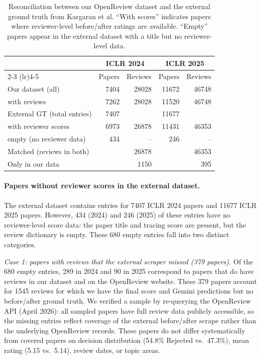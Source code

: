 \documentclass{article}
\begin{document}
\begin{table}[htbp]
  \centering
  \caption{Reconciliation between our OpenReview dataset and the external ground truth from Kargaran et al. ``With scores'' indicates papers where reviewer-level before/after ratings are available. ``Empty'' papers appear in the external dataset with a title but no reviewer-level data.}
  \label{tab:external-gt}
  \small
  \begin{tabular}{lrrrr}
    \toprule
    & \multicolumn{2}{c}{\textbf{ICLR 2024}} & \multicolumn{2}{c}{\textbf{ICLR 2025}} \\
    \cmidrule(lr){2-3} \cmidrule(lr){4-5}
    & Papers & Reviews & Papers & Reviews \\
    \midrule
    Our dataset (all)              & \num{7404}  & \num{28028}  & \num{11672} & \num{46748}  \\
    \quad with reviews             & \num{7262}  & \num{28028}  & \num{11520} & \num{46748}  \\
    External GT (total entries)    & \num{7407}  &              & \num{11677} &              \\
    \quad with reviewer scores     & \num{6973}  & \num{26878}  & \num{11431} & \num{46353}  \\
    \quad empty (no reviewer data) & 434         & --           & 246         & --           \\
    \midrule
    Matched (reviews in both)      &             & \num{26878}  &             & \num{46353}  \\
    Only in our data               &             & \num{1150}   &             & 395          \\
    \bottomrule
  \end{tabular}
\end{table}

\paragraph{Papers without reviewer scores in the external dataset.}
The external dataset contains entries for \num{7407} ICLR 2024 papers and \num{11677} ICLR 2025 papers. However, 434 (2024) and 246 (2025) of these entries have no reviewer-level score data: the paper title and tracing score are present, but the review dictionary is empty. These 680 empty entries fall into two distinct categories.

\textit{Case 1: papers with reviews that the external scraper missed (379 papers).} Of the 680 empty entries, 289 in 2024 and 90 in 2025 correspond to papers that do have reviews in our dataset and on the OpenReview website. These 379 papers account for \num{1545} reviews for which we have the final score and Gemini predictions but no before/after ground truth. We verified a sample by re-querying the OpenReview API (April 2026): all sampled papers have full review data publicly accessible, so the missing entries reflect coverage of the external before/after scrape rather than the underlying OpenReview records. These papers do not differ systematically from covered papers on decision distribution (54.8\% Rejected vs.\ 47.3\%), mean rating (5.15 vs.\ 5.14), review dates, or topic areas.
\end{document}
